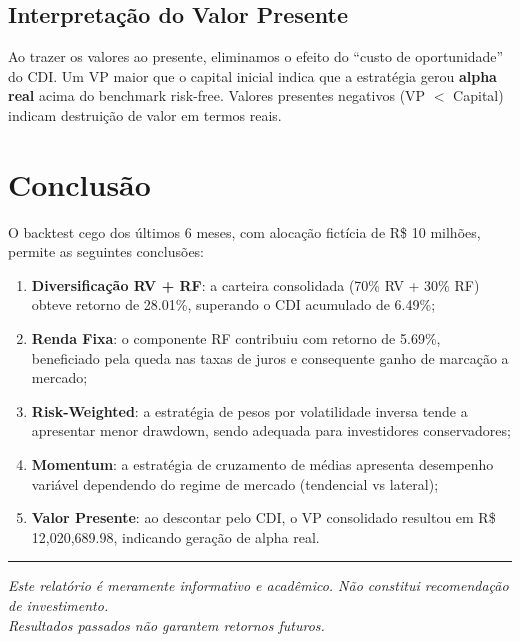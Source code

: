 \documentclass[a4paper, 12pt]{article}
\begin{document}
\subsection{Interpretação do Valor Presente}
Ao trazer os valores ao presente, eliminamos o efeito do ``custo de oportunidade'' do CDI.
Um VP maior que o capital inicial indica que a estratégia gerou \textbf{alpha real} acima do
benchmark risk-free. Valores presentes negativos (VP $<$ Capital) indicam destruição de valor
em termos reais.

\newpage
\section{Conclusão}

O backtest cego dos últimos 6 meses, com alocação fictícia de R\$ 10 milhões,
permite as seguintes conclusões:

\begin{enumerate}
    \item \textbf{Diversificação RV + RF}: a carteira consolidada (70\% RV + 30\% RF)
          obteve retorno de 28.01\%, superando o CDI acumulado de 6.49\%;

    \item \textbf{Renda Fixa}: o componente RF contribuiu com retorno de 5.69\%,
          beneficiado pela queda nas taxas de juros
          e consequente ganho de marcação a mercado;

    \item \textbf{Risk-Weighted}: a estratégia de pesos por volatilidade inversa tende a apresentar
          menor drawdown, sendo adequada para investidores conservadores;

    \item \textbf{Momentum}: a estratégia de cruzamento de médias apresenta desempenho variável
          dependendo do regime de mercado (tendencial vs lateral);

    \item \textbf{Valor Presente}: ao descontar pelo CDI, o VP consolidado resultou em
          R\$ 12,020,689.98, indicando geração de alpha real.
\end{enumerate}

\vspace{1cm}
\noindent\rule{\textwidth}{0.4pt}
\begin{center}
\textit{Este relatório é meramente informativo e acadêmico. Não constitui recomendação de investimento.\\
Resultados passados não garantem retornos futuros.}
\end{center}
\end{document}
